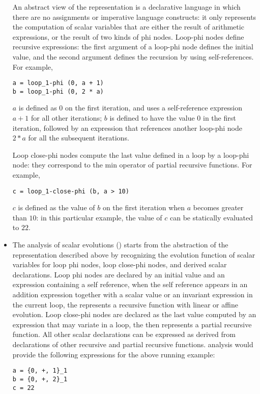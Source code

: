 \documentclass{sig-alternate}
\begin{document}
\begin{itemize}
  An abstract view of the \SSA{} representation is a declarative language
  \cite{spop2007} in which there are no assignments or imperative language
  constructs: it only represents the computation of scalar variables that are
  either the result of arithmetic expressions, or the result of two kinds of phi
  nodes.  Loop-phi nodes define recursive expressions: the first argument of a
  loop-phi node defines the initial value, and the second argument defines the
  recursion by using self-references.  For example,
  \begin{verbatim}
a = loop_1-phi (0, a + 1)
b = loop_1-phi (0, 2 * a)
  \end{verbatim}
  $a$ is defined as $0$ on the first iteration, and uses a self-reference
  expression $a+1$ for all other iterations; $b$ is defined to have the value
  $0$ in the first iteration, followed by an expression that references another
  loop-phi node $2 * a$ for all the subsequent iterations.

  Loop close-phi nodes compute the last value defined in a loop by a loop-phi
  node: they correspond to the min operator of partial recursive functions.  For
  example,
  \begin{verbatim}
c = loop_1-close-phi (b, a > 10)
  \end{verbatim}
  $c$ is defined as the value of $b$ on the first iteration when $a$ becomes
  greater than $10$: in this particular example, the value of $c$ can be
  statically evaluated to $22$.

\item The analysis of scalar evolutions (\scev{}) \cite{scev} starts from the
  abstraction of the \SSA{} representation described above by recognizing the
  evolution function of scalar variables for loop phi nodes, loop close-phi
  nodes, and derived scalar declarations.  Loop phi nodes are declared by an
  initial value and an expression containing a self reference, when the self
  reference appears in an addition expression together with a scalar value or an
  invariant expression in the current loop, the \scev{} represents a recursive
  function with linear or affine evolution.  Loop close-phi nodes are declared
  as the last value computed by an expression that may variate in a loop, the
  \scev{} then represents a partial recursive function.  All other scalar
  declarations can be expressed as  derived from declarations of other
  recursive and partial recursive functions.  \scev{} analysis would provide the
  following expressions for the above running example:
  \begin{verbatim}
a = {0, +, 1}_1
b = {0, +, 2}_1
c = 22
  \end{verbatim}


\end{itemize}
\end{document}
